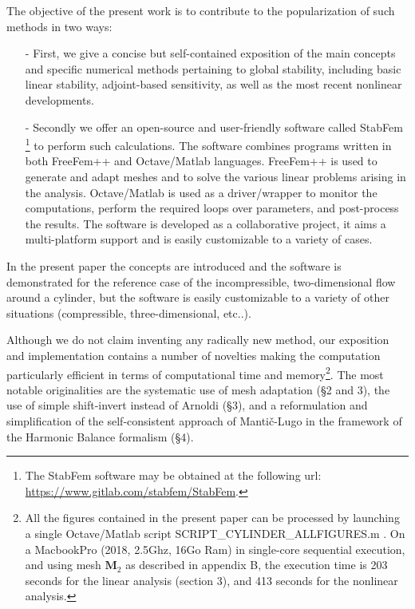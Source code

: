 \documentclass[twocolumn,10pt]{asme2ej}
\begin{document}
The objective of the present work is to contribute to the popularization of such methods 
in two ways:
\begin{itemize}
\item[-]
First, we give a concise but self-contained exposition of the main concepts and 
specific numerical methods pertaining to global stability, including basic linear stability, adjoint-based sensitivity, as well as the most recent nonlinear developments.
\item[-]
Secondly we offer an open-source and user-friendly software called  {\sf StabFem} %
\footnote{The StabFem software may be obtained at the following url: \\
\url{https://www.gitlab.com/stabfem/StabFem}. 
} 
to perform such calculations. The software combines programs written in both FreeFem++ \cite{MR3043640} and Octave/Matlab languages. 
FreeFem++ is used to generate and adapt meshes and to solve the various linear problems arising in the analysis. Octave/Matlab is used as a driver/wrapper to monitor the computations, perform the required loops over parameters, and post-process the results. The software is developed as a collaborative project, it aims a multi-platform support and is easily customizable to a variety of cases. 
\end{itemize}

In the present paper the concepts are introduced and the software is demonstrated for the reference case of the incompressible, two-dimensional flow around a cylinder, but the software is easily customizable to a variety of other situations (compressible, three-dimensional, etc..).

Although we do not claim inventing any radically new method, our exposition and implementation contains a number of novelties making the computation particularly efficient in terms of computational time and memory\footnote{All the figures contained in the present paper can be processed by launching a single Octave/Matlab script {\sf SCRIPT\_CYLINDER\_ALLFIGURES.m} . On a MacbookPro (2018,  2.5Ghz, 16Go Ram) in single-core sequential execution,  and using mesh ${\mathbf M}_2$ as described in appendix B, the execution time is 203 seconds for the linear analysis (section 3), and 413 seconds for the nonlinear analysis.}.
The most notable originalities are the systematic use of mesh adaptation (\S 2 and 3), the use of simple shift-invert instead of Arnoldi (\S 3), and a reformulation and simplification of the self-consistent approach of Manti\v{c}-Lugo in the framework of the Harmonic Balance formalism   (\S 4).
 
\end{document}
